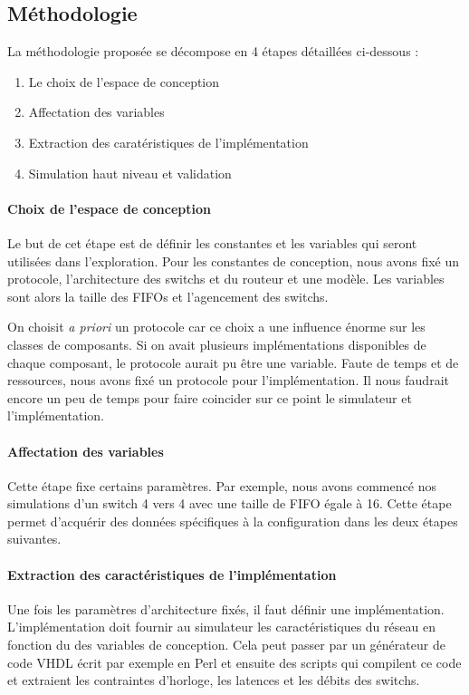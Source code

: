 \documentclass[11pt]{article}
\begin{document}
\subsection{Méthodologie}

La méthodologie proposée se décompose en 4 étapes détaillées ci-dessous :
\begin{enumerate}
\item Le choix de l'espace de conception
\item Affectation des variables
\item Extraction des caratéristiques de l'implémentation
\item Simulation haut niveau et validation
\end{enumerate}

\paragraph{Choix de l'espace de conception}
Le but de cet étape est de définir les constantes et les variables qui seront utilisées dans l'exploration. Pour les constantes de conception, nous avons fixé un protocole, l'architecture des switchs et du routeur et une modèle. Les variables sont alors la taille des FIFOs et l'agencement des switchs.

On choisit \textit{a priori} un protocole car ce choix a une influence énorme sur les classes de composants. Si on avait plusieurs implémentations disponibles de chaque composant, le protocole aurait pu être une variable. Faute de temps et de ressources, nous avons fixé un protocole pour l'implémentation. Il nous faudrait encore un peu de temps pour faire coincider sur ce point le simulateur et l'implémentation.

\paragraph{Affectation des variables}
Cette étape fixe certains paramètres. Par exemple, nous avons commencé nos simulations d'un switch 4 vers 4 avec une taille de FIFO égale à 16. Cette étape permet d'acquérir des données spécifiques à la configuration dans les deux étapes suivantes.

\paragraph{Extraction des caractéristiques de l'implémentation}
Une fois les paramètres d'architecture fixés, il faut définir une implémentation. L'implémentation doit fournir au simulateur les caractéristiques du réseau en fonction du des variables de conception. Cela peut passer par un générateur de code VHDL écrit par exemple en Perl et ensuite des scripts qui compilent ce code et extraient les contraintes d'horloge, les latences et les débits des switchs.
\end{document}

